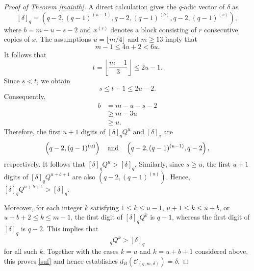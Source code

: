 \documentclass[10pt,a4paper]{amsart}
\begin{document}
\begin{proof}[Proof of Theorem \ref{mainth}]
A direct calculation
gives the $q$-adic vector of $\delta$ as 
\begin{equation}\label{deltaq}
    [\delta]_q = \left( q-2, (q-1)^{(u-1)}, q-2, (q-1)^{(b)}, q-2, (q-1)^{(s)} \right),
\end{equation}
where $b = m - u - s - 2$ and $x^{(r)}$ denotes a block consisting of $r$ consecutive copies of
$x$.
The assumptions $u = \lfloor m/4 \rfloor$ and $m \ge 13$ imply that
\begin{equation*}
    m - 1 \le 4u + 2 < 6u.
\end{equation*}
It follows that
\begin{equation*}
    t = \left\lfloor \frac{m-1}{3} \right\rfloor \le 2u - 1.
\end{equation*}
Since $s < t$, we obtain
\begin{equation}\label{hao}
    s \le t - 1 \le 2u - 2.
\end{equation}
Consequently,
\begin{equation}\label{bgequ}
\begin{split}
    b &= m - u - s - 2 \\
    &\ge m - 3u\\ 
    &\ge u.
    \end{split}
\end{equation} 
Therefore, the first $u+1$ digits of $[\delta]_qQ^u$ and $[\delta]_q$
are
\begin{equation*}
    \left(q-2,(q-1)^{(u)}\right)\quad \hbox{and}\quad 
\left(q-2,(q-1)^{(u-1)},q-2\right), 
\end{equation*}
respectively. It follows that $[\delta]_q Q^{u} > [\delta]_q$. 
Similarly, since $s \ge u$, the first $u+1$ digits of
$[\delta]_q Q^{u+b+1}$ are also  $\left( q-2, (q-1)^{(u)} \right)$. Hence,
$
    [\delta]_q Q^{u+b+1} > [\delta]_q.
$ 


Moreover, for each integer  $k$ satisfying $1\leq k\leq u-1$,
$u+1\leq k\leq u+b$, or $u+b+2\leq k\leq m-1$, 
the first digit of $[\delta]_q Q^k$ is $q-1$, whereas the first digit of
$[\delta]_q$ is $q-2$.
This implies that
\begin{equation*}
    [\delta]_q Q^k > [\delta]_q
\end{equation*}
for all such $k$. Together with the cases $k=u$ and $k=u+b+1$ considered above, this
proves \eqref{suf} and hence establishes
$d_B(\mathcal{C}_{(q,m,\delta)})=\delta$.


\end{proof}
\end{document}
